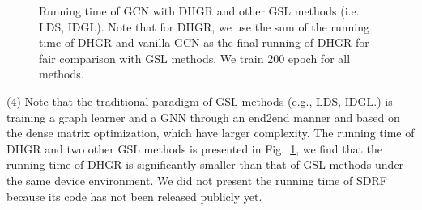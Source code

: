 \documentclass[sigconf]{acmart}
\begin{document}
	\begin{figure}[h]
		\begin{minipage}[t]{0.33\linewidth}
			\centering
\end{minipage}\begin{minipage}[t]{0.33\linewidth}
			\centering
		\end{minipage}
		\begin{minipage}[t]{0.33\linewidth}
			\centering
		\end{minipage}
		\caption{Running time of GCN with DHGR and other GSL methods (i.e. LDS, IDGL). Note that for DHGR, we use the sum of the running time of DHGR and vanilla GCN as the final running of DHGR for fair comparison with GSL methods. We train 200 epoch for all methods.}
		
		\label{fig:run_time}
	\end{figure}
	(4) Note that the traditional paradigm of GSL methods (e.g., LDS, IDGL.) is training a graph learner and  a GNN through an end2end manner and based on the dense matrix optimization, which have larger complexity. The running time of DHGR and two other GSL methods is presented in Fig.~\ref{fig:run_time}, we find that the running time of DHGR is significantly smaller than that of GSL methods under the same device environment. We did not present the running time of SDRF because its code has not been released publicly yet.
\end{document}

